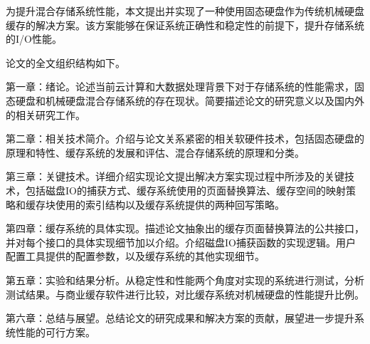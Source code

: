为提升混合存储系统性能，本文提出并实现了一种使用固态硬盘作为传统机械硬盘缓存的解决方案。该方案能够在保证系统正确性和稳定性的前提下，提升存储系统的I/O性能。

论文的全文组织结构如下。

第一章：绪论。论述当前云计算和大数据处理背景下对于存储系统的性能需求，固态硬盘和机械硬盘混合存储系统的存在现状。简要描述论文的研究意义以及国内外的相关研究工作。

第二章：相关技术简介。介绍与论文关系紧密的相关软硬件技术，包括固态硬盘的原理和特性、缓存系统的发展和评估、混合存储系统的原理和分类。

第三章：关键技术。详细介绍实现论文提出解决方案实现过程中所涉及的关键技术，包括磁盘IO的捕获方式、缓存系统使用的页面替换算法、缓存空间的映射策略和缓存块使用的索引结构以及缓存系统提供的两种回写策略。

第四章：缓存系统的具体实现。描述论文抽象出的缓存页面替换算法的公共接口，并对每个接口的具体实现细节加以介绍。介绍磁盘IO捕获函数的实现逻辑。用户配置工具提供的配置参数，以及缓存系统的其他实现细节。

第五章：实验和结果分析。从稳定性和性能两个角度对实现的系统进行测试，分析测试结果。与商业缓存软件进行比较，对比缓存系统对机械硬盘的性能提升比例。

第六章：总结与展望。总结论文的研究成果和解决方案的贡献，展望进一步提升系统性能的可行方案。

